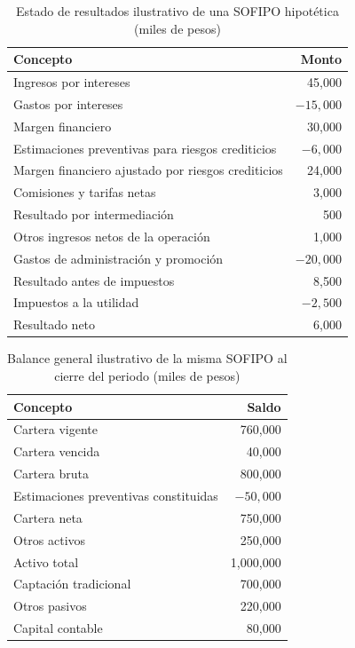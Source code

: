 \begin{table}[htbp]
\centering
\small
\caption{Estado de resultados ilustrativo de una SOFIPO hipotética (miles de pesos)}
\label{tab:estado_ilustrativo}
\begin{tabular}{lr}
\toprule
Concepto & Monto \\
\midrule
Ingresos por intereses & 45{,}000 \\
Gastos por intereses & $-15{,}000$ \\
Margen financiero & 30{,}000 \\
Estimaciones preventivas para riesgos crediticios & $-6{,}000$ \\
Margen financiero ajustado por riesgos crediticios & 24{,}000 \\
Comisiones y tarifas netas & 3{,}000 \\
Resultado por intermediación & 500 \\
Otros ingresos netos de la operación & 1{,}000 \\
Gastos de administración y promoción & $-20{,}000$ \\
Resultado antes de impuestos & 8{,}500 \\
Impuestos a la utilidad & $-2{,}500$ \\
Resultado neto & 6{,}000 \\
\bottomrule
\end{tabular}
\end{table}

\begin{table}[htbp]
\centering
\small
\caption{Balance general ilustrativo de la misma SOFIPO al cierre del periodo (miles de pesos)}
\label{tab:balance_ilustrativo}
\begin{tabular}{lr}
\toprule
Concepto & Saldo \\
\midrule
Cartera vigente & 760{,}000 \\
Cartera vencida & 40{,}000 \\
Cartera bruta & 800{,}000 \\
Estimaciones preventivas constituidas & $-50{,}000$ \\
Cartera neta & 750{,}000 \\
Otros activos & 250{,}000 \\
Activo total & 1{,}000{,}000 \\
Captación tradicional & 700{,}000 \\
Otros pasivos & 220{,}000 \\
Capital contable & 80{,}000 \\
\bottomrule
\end{tabular}
\end{table}

